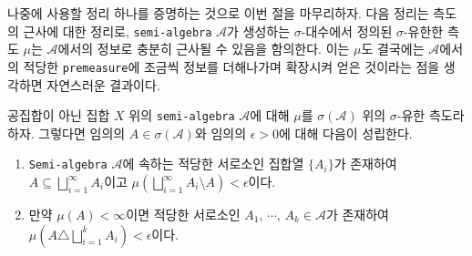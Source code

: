 나중에 사용할 정리 하나를 증명하는 것으로 이번 절을 마무리하자. 다음 정리는 측도의 근사에 대한 정리로, \texttt{semi-algebra} $\mathcal{A}$가 생성하는 $\sigma$-대수에서 정의된 $\sigma$-유한한 측도 $\mu$는 $\mathcal{A}$에서의 정보로 충분히 근사될 수 있음을 함의한다. 이는 $\mu$도 결국에는 $\mathcal{A}$에서의 적당한 \texttt{premeasure}에 조금씩 정보를 더해나가며 확장시켜 얻은 것이라는 점을 생각하면 자연스러운 결과이다.

\begin{theorem}\label{thm:measureApprox}
    공집합이 아닌 집합 $X$ 위의 \texttt{semi-algebra} $\mathcal{A}$에 대해 $\mu$를 $\sigma(\mathcal{A})$ 위의 $\sigma$-유한 측도라 하자. 그렇다면 임의의 $A\in\sigma(\mathcal{A})$와 임의의 $\epsilon>0$에 대해 다음이 성립한다.
    \begin{enumerate}
        \item \texttt{Semi-algebra} $\mathcal{A}$에 속하는 적당한 서로소인 집합열 $\{A_i\}$가 존재하여 $A\subseteq\bigsqcup_{i=1}^\infty A_i$이고 $\mu(\bigsqcup_{i=1}^\infty A_i\setminus A)<\epsilon$이다.
        \item 만약 $\mu(A)<\infty$이면 적당한 서로소인 $A_1,\,\cdots,\,A_k\in\mathcal{A}$가 존재하여 $\mu(A\triangle\bigsqcup_{i=1}^kA_i)<\epsilon$이다.
    \end{enumerate}
\end{theorem}

